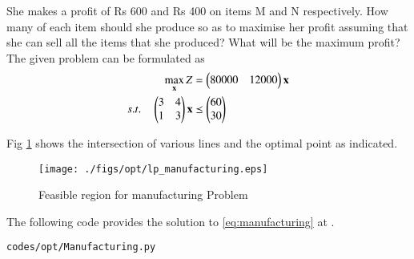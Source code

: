 \begin{enumerate}[label=\thesubsection.\arabic*.,ref=\thesubsection.\theenumi]
\begin{tabular}{|c|c|c|c|}
\end{tabular}

She makes a profit of Rs 600 and Rs 400 on items M and N respectively. How many
of each item should she produce so as to maximise her profit assuming that she can sell
all the items that she produced? What will be the maximum profit?
\\
\solution The given problem can be formulated as
\begin{align}
\max_{\mathbf{x}} Z &= \begin{pmatrix}80000&12000\end{pmatrix}\mathbf{x}
\\
s.t. \quad 
\begin{pmatrix}
3 & 4
\\
1 & 3
\end{pmatrix}
\mathbf{x} & \preceq \begin{pmatrix}60\\30\end{pmatrix}
\label{eq:manufacturing}
\end{align}

Fig  \ref{fig:manufacturing}
shows the intersection of various lines and the optimal point as indicated.
\begin{figure}[h]
\texttt{[image: ./figs/opt/lp\_manufacturing.eps]}
\caption{Feasible region for manufacturing Problem}
\caption{}
\label{fig:manufacturing}
\end{figure}

The following code provides the solution to \eqref{eq:manufacturing} at .
%
\begin{lstlisting}
codes/opt/Manufacturing.py
\end{lstlisting}


\end{enumerate}
